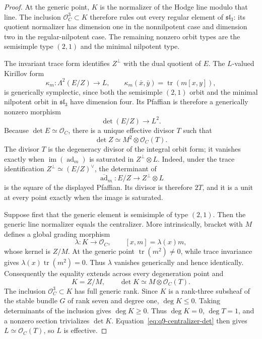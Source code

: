 \documentclass[11pt]{article}
\theoremstyle{definition}
\newcommand{\Ocal}{\mathcal O}
\newcommand{\ad}{\operatorname{ad}}
\begin{document}
\begin{proof}
At the generic point, $K$ is the normalizer of the Hodge line modulo that
line.  The inclusion $\Ocal_C^3\subset K$ therefore rules out every regular
element of $\mathfrak{sl}_3$: its quotient normalizer has dimension one in
the nonnilpotent case and dimension two in the regular-nilpotent case.  The
remaining nonzero orbit types are the semisimple type $(2,1)$ and the minimal
nilpotent type.

The invariant trace form identifies $Z^\perp$ with the dual quotient of $E$.
The $L$-valued Kirillov form
\[
 \kappa_m:\Lambda^2(E/Z)\longrightarrow L,
 \qquad \kappa_m(\bar x,\bar y)=\operatorname{tr}(m[x,y]),
\]
is generically symplectic, since both the semisimple $(2,1)$ orbit and the
minimal nilpotent orbit in $\mathfrak{sl}_3$ have dimension four.  Its
Pfaffian is therefore a generically nonzero morphism
\[
 \det(E/Z)\longrightarrow L^2.
\]
Because $\det E\simeq\Ocal_C$, there is a unique effective divisor $T$ such
that
\begin{equation}
 \det Z\simeq M^2\otimes\Ocal_C(T).
 \label{eq:q9-centralizer-det}
\end{equation}
The divisor $T$ is the degeneracy divisor of the integral orbit form; it
vanishes exactly when $\operatorname{im}(\ad_m)$ is saturated in
$Z^\perp\otimes L$.
Indeed, under the trace identification
$Z^\perp\simeq(E/Z)^\vee$, the determinant of
\[
 \overline{\ad}_m:E/Z\longrightarrow Z^\perp\otimes L
\]
is the square of the displayed Pfaffian.  Its divisor is therefore $2T$,
and it is a unit at every point exactly when the image is saturated.

Suppose first that the generic element is semisimple of type $(2,1)$.  Then
the generic line normalizer equals the centralizer.  More intrinsically,
bracket with $M$ defines a global grading morphism
\[
 \lambda:K\longrightarrow\Ocal_C,
 \qquad [x,m]=\lambda(x)m,
\]
whose kernel is $Z/M$.  At the generic point
$\operatorname{tr}(m^2)\ne0$, while trace invariance gives
$\lambda(x)\operatorname{tr}(m^2)=0$.  Thus $\lambda$ vanishes generically
and hence identically.  Consequently the equality extends across every
degeneration point and
\[
 K=Z/M,
 \qquad \det K\simeq M\otimes\Ocal_C(T).
\]
The inclusion $\Ocal_C^3\subset K$ has full generic rank.  Since $K$ is a
rank-three subsheaf of the stable bundle $G$ of rank seven and degree one,
$\deg K\le0$.  Taking determinants of the inclusion gives $\deg K\ge0$.
Thus $\deg K=0$, $\deg T=1$, and a nonzero section trivializes $\det K$.
Equation~\eqref{eq:q9-centralizer-det} then gives
$L\simeq\Ocal_C(T)$, so $L$ is effective.


\end{proof}
\end{document}
